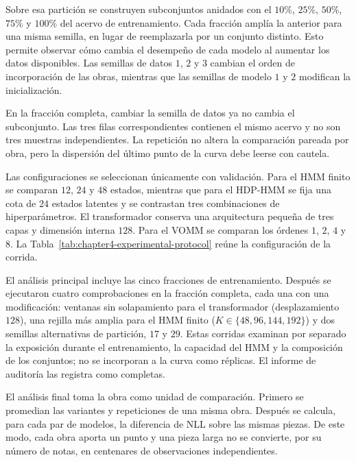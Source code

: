 Sobre esa partición se construyen subconjuntos anidados con el $10\%$, $25\%$, $50\%$, $75\%$ y $100\%$ del acervo de entrenamiento. Cada fracción amplía la anterior para una misma semilla, en lugar de reemplazarla por un conjunto distinto. Esto permite observar cómo cambia el desempeño de cada modelo al aumentar los datos disponibles. Las semillas de datos $1$, $2$ y $3$ cambian el orden de incorporación de las obras, mientras que las semillas de modelo $1$ y $2$ modifican la inicialización.

En la fracción completa, cambiar la semilla de datos ya no cambia el subconjunto. Las tres filas correspondientes contienen el mismo acervo y no son tres muestras independientes. La repetición no altera la comparación pareada por obra, pero la dispersión del último punto de la curva debe leerse con cautela.

Las configuraciones se seleccionan únicamente con validación. Para el HMM finito se comparan $12$, $24$ y $48$ estados, mientras que para el HDP-HMM se fija una cota de $24$ estados latentes y se contrastan tres combinaciones de hiperparámetros. El transformador conserva una arquitectura pequeña de tres capas y dimensión interna $128$. Para el VOMM se comparan los órdenes $1$, $2$, $4$ y $8$. La Tabla~\ref{tab:chapter4-experimental-protocol} reúne la configuración de la corrida.

\begin{table}[H]
\centering
\caption{Protocolo ejecutado para la comparación predictiva}
\label{tab:chapter4-experimental-protocol}
\resizebox{\textwidth}{!}{}
\end{table}

El análisis principal incluye las cinco fracciones de entrenamiento. Después se ejecutaron cuatro comprobaciones en la fracción completa, cada una con una modificación: ventanas sin solapamiento para el transformador (desplazamiento $128$), una rejilla más amplia para el HMM finito ($K\in\{48,96,144,192\}$) y dos semillas alternativas de partición, $17$ y $29$. Estas corridas examinan por separado la exposición durante el entrenamiento, la capacidad del HMM y la composición de los conjuntos; no se incorporan a la curva como réplicas. El informe de auditoría las registra como completas.

El análisis final toma la obra como unidad de comparación. Primero se promedian las variantes y repeticiones de una misma obra. Después se calcula, para cada par de modelos, la diferencia de NLL sobre las mismas piezas. De este modo, cada obra aporta un punto y una pieza larga no se convierte, por su número de notas, en centenares de observaciones independientes.

